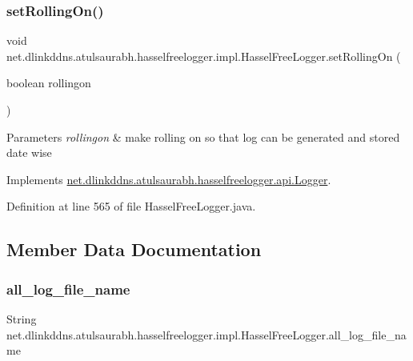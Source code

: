 \subsubsection{\texorpdfstring{set\+Rolling\+On()}{setRollingOn()}}
{\footnotesize\ttfamily void net.\+dlinkddns.\+atulsaurabh.\+hasselfreelogger.\+impl.\+Hassel\+Free\+Logger.\+set\+Rolling\+On (\begin{DoxyParamCaption}\item[{boolean}]{rollingon }\end{DoxyParamCaption})}


\begin{DoxyParams}{Parameters}
{\em rollingon} & make rolling on so that log can be generated and stored date wise \\
\hline
\end{DoxyParams}


Implements \mbox{\hyperlink{interfacenet_1_1dlinkddns_1_1atulsaurabh_1_1hasselfreelogger_1_1api_1_1_logger_a2f15f4d94258528efb2938323deb8135}{net.\+dlinkddns.\+atulsaurabh.\+hasselfreelogger.\+api.\+Logger}}.



Definition at line 565 of file Hassel\+Free\+Logger.\+java.



\subsection{Member Data Documentation}
\mbox{\label{classnet_1_1dlinkddns_1_1atulsaurabh_1_1hasselfreelogger_1_1impl_1_1_hassel_free_logger_a3a3f8e530a17b2623a482c50d091e531}} 
\subsubsection{\texorpdfstring{all\+\_\+log\+\_\+file\+\_\+name}{all\_log\_file\_name}}
{\footnotesize\ttfamily String net.\+dlinkddns.\+atulsaurabh.\+hasselfreelogger.\+impl.\+Hassel\+Free\+Logger.\+all\+\_\+log\+\_\+file\+\_\+name\hspace{0.3cm}{\ttfamily [private]}}

